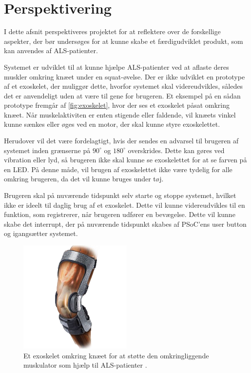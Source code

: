 \section{Perspektivering} \label{perspektivering}
I dette afsnit perspektiveres projektet for at reflektere over de forskellige aspekter, der bør undersøges for at kunne skabe et færdigudviklet produkt, som kan anvendes af ALS-patienter. 

Systemet er udviklet til at kunne hjælpe ALS-patienter ved at aflaste deres muskler omkring knæet under en squat-øvelse. Der er ikke udviklet en prototype af et exoskelet, der muliggør dette, hvorfor systemet skal videreudvikles, således det er anvendeligt uden at være til gene for brugeren. Et eksempel på en sådan prototype fremgår af \autoref{fig:exoskelet}, hvor der ses et exoskelet påsat omkring knæet. Når muskelaktiviten er enten stigende eller faldende, vil knæets vinkel kunne sænkes eller øges ved en motor, der skal kunne styre exoskelettet.

Herudover vil det være fordelagtigt, hvis der sendes en advarsel til brugeren af systemet inden grænserne på $90^{\circ}$ og $180^{\circ}$ overskrides. Dette kan gøres ved vibration eller lyd, så brugeren ikke skal kunne se exoskelettet for at se farven på en LED. På denne måde, vil brugen af exoskelettet ikke være tydelig for alle omkring brugeren, da det vil kunne bruges under tøj.

Brugeren skal på nuværende tidspunkt selv starte og stoppe systemet, hvilket ikke er ideelt til daglig brug af et exoskelet. Dette vil kunne videreudvikles til en funktion, som registrerer, når brugeren udfører en bevægelse. Dette vil kunne skabe det interrupt, der på nuværende tidspunkt skabes af PSoC'ens user button og igangsætter systemet. 

\begin{figure}[H]
\centering
\includegraphics[width=0.5\textwidth]{figures/exoskelet}
\caption{Et exoskelet omkring knæet for at støtte den omkringliggende muskulator som hjælp til ALS-patienter \citep{djo}.}
\label{fig:exoskelet}
\end{figure}

